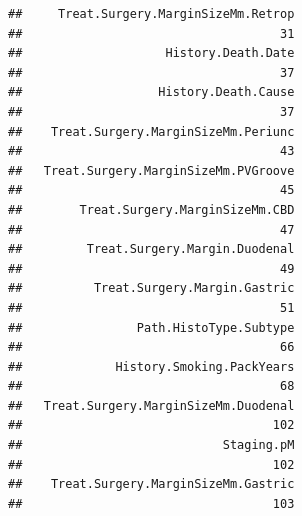 \documentclass{article}\usepackage[]{graphicx}\usepackage[]{color}
\makeatletter
\newenvironment{kframe}{%
 \def\at@end@of@kframe{}%
 \ifinner\ifhmode%
  \def\at@end@of@kframe{\end{minipage}}%
  \begin{minipage}{\columnwidth}%
 \fi\fi%
 \def\FrameCommand##1{\hskip\@totalleftmargin \hskip-\fboxsep
 \colorbox{shadecolor}{##1}\hskip-\fboxsep
     \hskip-\linewidth \hskip-\@totalleftmargin \hskip\columnwidth}%
 \MakeFramed {\advance\hsize-\width
   \@totalleftmargin\z@ \linewidth\hsize
   \@setminipage}}%
 {\par\unskip\endMakeFramed%
 \at@end@of@kframe}
\newenvironment{knitrout}{}{} %
\makeatother
\begin{document}
\begin{knitrout}
\begin{kframe}
\begin{verbatim}
##     Treat.Surgery.MarginSizeMm.Retrop 
##                                    31 
##                    History.Death.Date 
##                                    37 
##                   History.Death.Cause 
##                                    37 
##    Treat.Surgery.MarginSizeMm.Periunc 
##                                    43 
##   Treat.Surgery.MarginSizeMm.PVGroove 
##                                    45 
##        Treat.Surgery.MarginSizeMm.CBD 
##                                    47 
##         Treat.Surgery.Margin.Duodenal 
##                                    49 
##          Treat.Surgery.Margin.Gastric 
##                                    51 
##                Path.HistoType.Subtype 
##                                    66 
##             History.Smoking.PackYears 
##                                    68 
##   Treat.Surgery.MarginSizeMm.Duodenal 
##                                   102 
##                            Staging.pM 
##                                   102 
##    Treat.Surgery.MarginSizeMm.Gastric 
##                                   103
\end{verbatim}
\end{kframe}
\end{knitrout}


\end{document}
